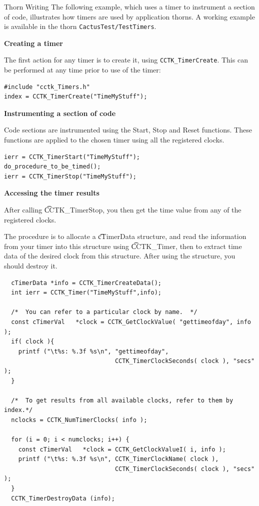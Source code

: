 \begin{cactuspart}{Thorn Writing}
The following example, which uses a timer  to
instrument a section of code, illustrates how timers are used by
application thorns. A working example is available in the thorn
\texttt{CactusTest/TestTimers}.

{\bf Creating a timer}

The first action for any timer is to create it, using
\texttt{CCTK\_TimerCreate}. 
This can be performed at any time prior to use of the timer:

\begin{verbatim}
#include "cctk_Timers.h"
index = CCTK_TimerCreate("TimeMyStuff");
\end{verbatim}

{\bf Instrumenting a section of code}

Code sections are instrumented using the Start, Stop and Reset functions. These
functions are applied to the chosen timer using all the registered clocks.
\begin{verbatim}
ierr = CCTK_TimerStart("TimeMyStuff");
do_procedure_to_be_timed();
ierr = CCTK_TimerStop("TimeMyStuff");
\end{verbatim}

{\bf Accessing the timer results}

After calling {\t CCTK\_TimerStop}, you then get the time value from
any of the registered clocks.

The procedure is to allocate a {\t cTimerData} structure,
and read the information from your timer into this structure
using {\t CCTK\_Timer}, then to extract time data of the desired clock from
this structure.  After using the structure, you should destroy it.

\begin{verbatim}
  cTimerData *info = CCTK_TimerCreateData();
  int ierr = CCTK_Timer("TimeMyStuff",info);

  /*  You can refer to a particular clock by name.  */
  const cTimerVal   *clock = CCTK_GetClockValue( "gettimeofday", info );
  if( clock ){
    printf ("\t%s: %.3f %s\n", "gettimeofday",
                               CCTK_TimerClockSeconds( clock ), "secs" );
  }

  /*  To get results from all available clocks, refer to them by index.*/
  nclocks = CCTK_NumTimerClocks( info );

  for (i = 0; i < numclocks; i++) {
    const cTimerVal   *clock = CCTK_GetClockValueI( i, info );
    printf ("\t%s: %.3f %s\n", CCTK_TimerClockName( clock ),
                               CCTK_TimerClockSeconds( clock ), "secs" );
  }
  CCTK_TimerDestroyData (info);
\end{verbatim}


\end{cactuspart}
